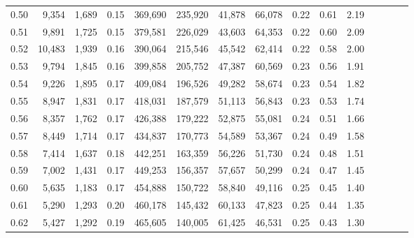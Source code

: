\begin{tabular}{rrrcrrrrrrrrrrr}
0.50 &   9,354 &  1,689 &                                       0.15 &  369,690 &  235,920 &   41,878 &   66,078 &  0.22 &  0.61 &                         2.19 \\
0.51 &   9,891 &  1,725 &                                       0.15 &  379,581 &  226,029 &   43,603 &   64,353 &  0.22 &  0.60 &                         2.09 \\
0.52 &  10,483 &  1,939 &                                       0.16 &  390,064 &  215,546 &   45,542 &   62,414 &  0.22 &  0.58 &                         2.00 \\
0.53 &   9,794 &  1,845 &                                       0.16 &  399,858 &  205,752 &   47,387 &   60,569 &  0.23 &  0.56 &                         1.91 \\
0.54 &   9,226 &  1,895 &                                       0.17 &  409,084 &  196,526 &   49,282 &   58,674 &  0.23 &  0.54 &                         1.82 \\
0.55 &   8,947 &  1,831 &                                       0.17 &  418,031 &  187,579 &   51,113 &   56,843 &  0.23 &  0.53 &                         1.74 \\
0.56 &   8,357 &  1,762 &                                       0.17 &  426,388 &  179,222 &   52,875 &   55,081 &  0.24 &  0.51 &                         1.66 \\
0.57 &   8,449 &  1,714 &                                       0.17 &  434,837 &  170,773 &   54,589 &   53,367 &  0.24 &  0.49 &                         1.58 \\
0.58 &   7,414 &  1,637 &                                       0.18 &  442,251 &  163,359 &   56,226 &   51,730 &  0.24 &  0.48 &                         1.51 \\
0.59 &   7,002 &  1,431 &                                       0.17 &  449,253 &  156,357 &   57,657 &   50,299 &  0.24 &  0.47 &                         1.45 \\
0.60 &   5,635 &  1,183 &                                       0.17 &  454,888 &  150,722 &   58,840 &   49,116 &  0.25 &  0.45 &                         1.40 \\
0.61 &   5,290 &  1,293 &                                       0.20 &  460,178 &  145,432 &   60,133 &   47,823 &  0.25 &  0.44 &                         1.35 \\
0.62 &   5,427 &  1,292 &                                       0.19 &  465,605 &  140,005 &   61,425 &   46,531 &  0.25 &  0.43 &                         1.30 \\

\end{tabular}
